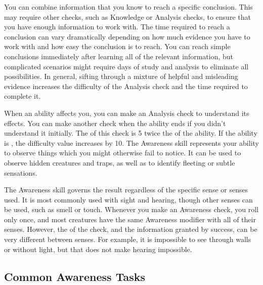      You can combine information that you know to reach a specific conclusion.
    This may require other checks, such as Knowledge or Analysis checks, to ensure that you have enough information to work with.
    The time required to reach a conclusion can vary dramatically depending on how much evidence you have to work with and how easy the conclusion is to reach.
    You can reach simple conclusions immediately after learning all of the relevant information, but complicated scenarios might require days of study and analysis to eliminate all possibilities.
    In general, sifting through a mixture of helpful and misleading evidence increases the difficulty of the Analysis check and the time required to complete it.
    
     When an ability affects you, you can make an Analysis check to understand its effects.
    You can make another check when the ability ends if you didn't understand it initially.
    The  of this check is 5 \add twice the  of the ability.
    If the ability is \atSubtle, the difficulty value increases by 10.
\newpage
{}
  The Awareness skill represents your ability to observe things which you might otherwise fail to notice.
  It can be used to observe hidden creatures and traps, as well as to identify fleeting or subtle sensations.

  The Awareness skill governs the result regardless of the specific sense or senses used.
  It is most commonly used with sight and hearing, though other senses can be used, such as smell or touch.
  Whenever you make an Awareness check, you roll only once, and most creatures have the same Awareness modifier with all of their senses.
  However, the  of the check, and the information granted by success, can be very different between senses.
  For example, it is impossible to see through walls or without light, but that does not make hearing impossible.

  \subsection{Common Awareness Tasks}

